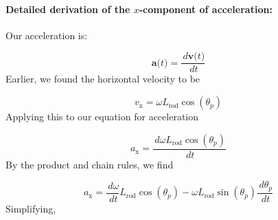 \documentclass[12pt]{article}
\begin{document}
\paragraph{Detailed derivation of the $x$-component of acceleration:}
\label{GD:accelerationIXDeriv}
Our acceleration is:

\begin{displaymath}
\symbf{a}\text{(}t\text{)}=\frac{\,d\symbf{v}\text{(}t\text{)}}{\,dt}
\end{displaymath}
Earlier, we found the horizontal velocity to be

\begin{displaymath}
{v_{\text{x}}}=ω {L_{\text{rod}}} \cos\left({θ_{p}}\right)
\end{displaymath}
Applying this to our equation for acceleration

\begin{displaymath}
{a_{\text{x}}}=\frac{\,dω {L_{\text{rod}}} \cos\left({θ_{p}}\right)}{\,dt}
\end{displaymath}
By the product and chain rules, we find

\begin{displaymath}
{a_{\text{x}}}=\frac{\,dω}{\,dt} {L_{\text{rod}}} \cos\left({θ_{p}}\right)-ω {L_{\text{rod}}} \sin\left({θ_{p}}\right) \frac{\,d{θ_{p}}}{\,dt}
\end{displaymath}
Simplifying,
\end{document}
